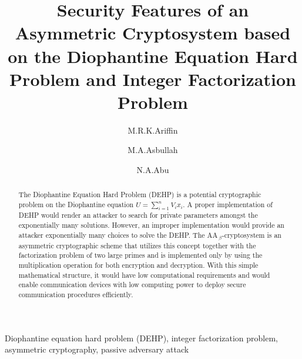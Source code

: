 \documentclass{llncs}
\begin{document}
\title{Security Features of an Asymmetric Cryptosystem based on the Diophantine Equation Hard Problem and Integer Factorization Problem}

\author{M.R.K.Ariffin  \and M.A.Asbullah  \and  N.A.Abu}

\maketitle

\begin{abstract}
\noindent The Diophantine Equation Hard Problem (DEHP) is a
potential cryptographic problem on the Diophantine equation
$U=\sum\limits_{i=1}^n {V_i x_{i}}$. A proper implementation of
DEHP would render an attacker to search for private parameters
amongst the exponentially many solutions. However, an improper
implementation would provide an attacker exponentially many
choices to solve the DEHP. The AA\,$_{\beta}$-cryptosystem is an
asymmetric cryptographic scheme that utilizes this concept
together with the factorization problem of two large primes and is
implemented only by using the multiplication operation for both
encryption and decryption. With this simple mathematical
structure, it would have low computational requirements and would
enable communication devices with low computing power to deploy
secure communication procedures efficiently.
\end{abstract}

\begin{keywords}{Diophantine equation hard problem (DEHP), integer factorization problem, asymmetric cryptography, passive adversary
attack} \end{keywords}


\let\thefootnote\relax{}
\end{document}
